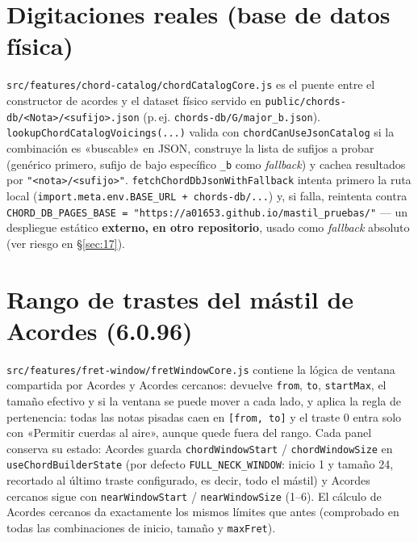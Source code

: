 \documentclass[a4paper,11pt,oneside]{report}
\newcommand{\Sref}[1]{\S\ref{#1}}
\begin{document}
\section{Digitaciones reales (base de datos física)}
\label{sec:8.6}

\lstinline!src/features/chord-catalog/chordCatalogCore.js! es el puente entre el constructor de acordes y el dataset físico servido en \lstinline!public/chords-db/<Nota>/<sufijo>.json! (p.\,ej. \lstinline!chords-db/G/major_b.json!). \lstinline!lookupChordCatalogVoicings(...)! valida con \lstinline!chordCanUseJsonCatalog! si la combinación es «buscable» en JSON, construye la lista de sufijos a probar (genérico primero, sufijo de bajo específico \lstinline!_b! como \textit{fallback}) y cachea resultados por \lstinline!"<nota>/<sufijo>"!. \lstinline[basicstyle=\ttfamily\bfseries\small]!fetchChordDbJsonWithFallback! intenta primero la ruta local (\lstinline!import.meta.env.BASE_URL + chords-db/...!) y, si falla, reintenta contra \lstinline!CHORD_DB_PAGES_BASE = "https://a01653.github.io/mastil_pruebas/"! --- un despliegue estático \textbf{externo, en otro repositorio}, usado como \textit{fallback} absoluto (ver riesgo en \Sref{sec:17}).

\section{Rango de trastes del mástil de Acordes (6.0.96)}
\label{sec:8.7}

\lstinline!src/features/fret-window/fretWindowCore.js! contiene la lógica de ventana compartida por Acordes y Acordes cercanos: \texttt{} devuelve \lstinline!from!, \lstinline!to!, \lstinline!startMax!, el tamaño efectivo y si la ventana se puede mover a cada lado, y \texttt{} aplica la regla de pertenencia: todas las notas pisadas caen en \lstinline![from, to]! y el traste 0 entra solo con «Permitir cuerdas al aire», aunque quede fuera del rango. Cada panel conserva su estado: Acordes guarda \lstinline!chordWindowStart! / \lstinline!chordWindowSize! en \lstinline!useChordBuilderState! (por defecto \lstinline!FULL_NECK_WINDOW!: inicio 1 y tamaño 24, recortado al último traste configurado, es decir, todo el mástil) y Acordes cercanos sigue con \lstinline!nearWindowStart! / \lstinline!nearWindowSize! (1--6). El cálculo de Acordes cercanos da exactamente los mismos límites que antes (comprobado en todas las combinaciones de inicio, tamaño y \lstinline!maxFret!).
\end{document}
